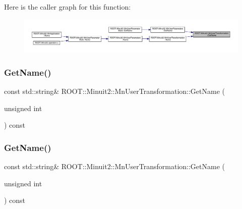 Here is the caller graph for this function\+:
\nopagebreak
\begin{figure}[H]
\begin{center}
\leavevmode
\includegraphics[width=350pt]{d9/d98/classROOT_1_1Minuit2_1_1MnUserTransformation_aa9cb2ec1cc12b7aec1160394bb95833d_icgraph}
\end{center}
\end{figure}
\mbox{\label{classROOT_1_1Minuit2_1_1MnUserTransformation_aa2b1548a49a6289914e4cde2fd40d780}} 
\subsubsection{\texorpdfstring{GetName()}{GetName()}\hspace{0.1cm}{\footnotesize\ttfamily [2/3]}}
{\footnotesize\ttfamily const std\+::string\& R\+O\+O\+T\+::\+Minuit2\+::\+Mn\+User\+Transformation\+::\+Get\+Name (\begin{DoxyParamCaption}\item[{unsigned int}]{ }\end{DoxyParamCaption}) const}

\mbox{\label{classROOT_1_1Minuit2_1_1MnUserTransformation_aa2b1548a49a6289914e4cde2fd40d780}} 
\subsubsection{\texorpdfstring{GetName()}{GetName()}\hspace{0.1cm}{\footnotesize\ttfamily [3/3]}}
{\footnotesize\ttfamily const std\+::string\& R\+O\+O\+T\+::\+Minuit2\+::\+Mn\+User\+Transformation\+::\+Get\+Name (\begin{DoxyParamCaption}\item[{unsigned int}]{ }\end{DoxyParamCaption}) const}

